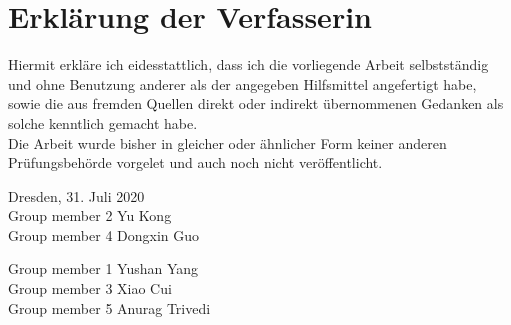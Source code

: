 
\thispagestyle{empty}
\chapter*{Erkl\"{a}rung der Verfasserin}

%
Hiermit erkl\"{a}re ich eidesstattlich, dass ich die vorliegende Arbeit
selbstst\"{a}ndig und ohne Benutzung anderer als der angegeben Hilfsmittel angefertigt habe, sowie die 
aus fremden Quellen direkt oder indirekt \"{u}bernommenen Gedanken als solche kenntlich gemacht habe.
\\
Die Arbeit wurde bisher in gleicher oder \"{a}hnlicher Form keiner anderen Pr\"{u}fungsbeh\"{o}rde vorgelet 
und auch  noch nicht ver\"{o}ffentlicht.%
\\[2cm]
%
\begin{multicols}{2}

Dresden, 31. Juli 2020
\\[2cm]
Group member 2 Yu Kong
\\[2cm]
Group member 4 Dongxin Guo

\columnbreak

Group member 1 Yushan Yang
\\[2cm]
Group member 3 Xiao Cui
\\[2cm]
Group member 5 Anurag Trivedi

\end{multicols}